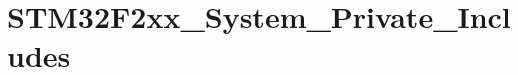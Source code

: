 \hypertarget{group___s_t_m32_f2xx___system___private___includes}{\section{S\-T\-M32\-F2xx\-\_\-\-System\-\_\-\-Private\-\_\-\-Includes}
\label{group___s_t_m32_f2xx___system___private___includes}
}
